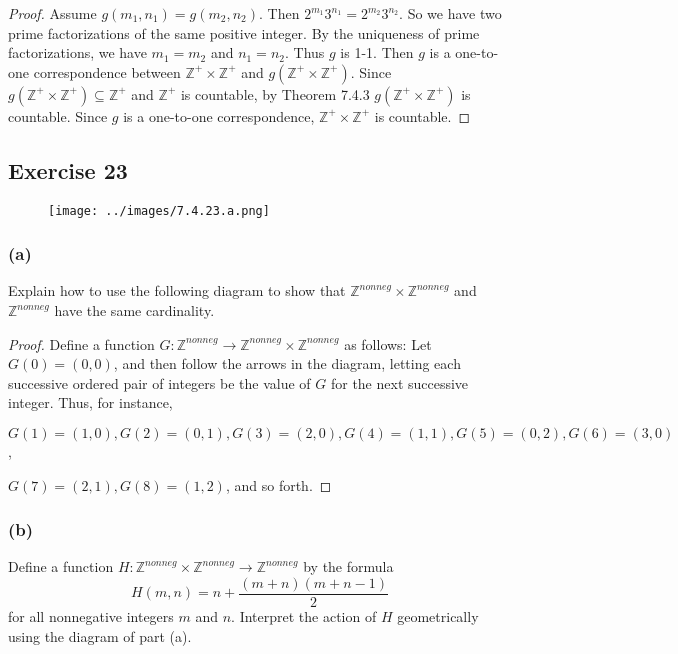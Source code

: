 \documentclass[14pt]{extarticle}
\newcommand{\Z}{\mathbb{Z}}
\begin{document}
\begin{proof}
    Assume \(g(m_1, n_1) = g(m_2, n_2)\). Then \(2^{m_1}3^{n_1} = 2^{m_2}3^{n_2}\). So we have two prime factorizations of
    the same positive integer. By the uniqueness of prime factorizations, we have \(m_1 = m_2\) and \(n_1 = n_2\).
    Thus $g$ is 1-1. Then $g$ is a one-to-one correspondence between \(\Z^+ \times \Z^+\) and \(g(\Z^+ \times \Z^+)\).
    Since \(g(\Z^+ \times \Z^+) \subseteq \Z^+\) and $\Z^+$ is countable, by Theorem 7.4.3 \(g(\Z^+ \times \Z^+)\) is
    countable. Since $g$ is a one-to-one correspondence, \(\Z^+ \times \Z^+\) is countable.
\end{proof}

\subsection{Exercise 23}
\begin{figure}[ht!]
    \centering
    \texttt{[image: ../images/7.4.23.a.png]}
\end{figure}

\subsubsection{(a)}
Explain how to use the following diagram to show that \(\Z^{nonneg} \times \Z^{nonneg}\) and \(\Z^{nonneg}\) have
the same cardinality.

\begin{proof}
    Define a function \(G: \Z^{nonneg} \to \Z^{nonneg} \times \Z^{nonneg}\) as follows: Let \(G(0) = (0, 0)\), and then
    follow the arrows in the diagram, letting each successive ordered pair of integers be the value of $G$ for the next successive integer. Thus, for instance,

    \(G(1) = (1, 0), G(2) = (0, 1), G(3) = (2, 0), G(4) = (1, 1), G(5) = (0, 2), G(6) = (3, 0)\),

    \(G(7) = (2, 1), G(8) = (1, 2)\), and so forth.
\end{proof}

\subsubsection{(b)}
Define a function \(H: \Z^{nonneg} \times \Z^{nonneg} \to \Z^{nonneg}\) by the formula
\[
    H(m, n) = n + \frac{(m+n)(m+n-1)}{2}
\]
for all nonnegative integers $m$ and $n$. Interpret the action of $H$ geometrically using the diagram of part (a).
\end{document}
